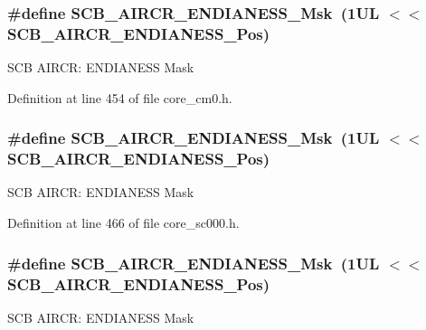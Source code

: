 \subsubsection[{\texorpdfstring{S\+C\+B\+\_\+\+A\+I\+R\+C\+R\+\_\+\+E\+N\+D\+I\+A\+N\+E\+S\+S\+\_\+\+Msk}{SCB_AIRCR_ENDIANESS_Msk}}]{\setlength{\rightskip}{0pt plus 5cm}\#define S\+C\+B\+\_\+\+A\+I\+R\+C\+R\+\_\+\+E\+N\+D\+I\+A\+N\+E\+S\+S\+\_\+\+Msk~(1\+U\+L $<$$<$ S\+C\+B\+\_\+\+A\+I\+R\+C\+R\+\_\+\+E\+N\+D\+I\+A\+N\+E\+S\+S\+\_\+\+Pos)}\hypertarget{group___c_m_s_i_s___s_c_b_ga2f571f93d3d4a6eac9a3040756d3d951}{}\label{group___c_m_s_i_s___s_c_b_ga2f571f93d3d4a6eac9a3040756d3d951}
S\+CB A\+I\+R\+CR\+: E\+N\+D\+I\+A\+N\+E\+SS Mask 

Definition at line 454 of file core\+\_\+cm0.\+h.

\subsubsection[{\texorpdfstring{S\+C\+B\+\_\+\+A\+I\+R\+C\+R\+\_\+\+E\+N\+D\+I\+A\+N\+E\+S\+S\+\_\+\+Msk}{SCB_AIRCR_ENDIANESS_Msk}}]{\setlength{\rightskip}{0pt plus 5cm}\#define S\+C\+B\+\_\+\+A\+I\+R\+C\+R\+\_\+\+E\+N\+D\+I\+A\+N\+E\+S\+S\+\_\+\+Msk~(1\+U\+L $<$$<$ S\+C\+B\+\_\+\+A\+I\+R\+C\+R\+\_\+\+E\+N\+D\+I\+A\+N\+E\+S\+S\+\_\+\+Pos)}\hypertarget{group___c_m_s_i_s___s_c_b_ga2f571f93d3d4a6eac9a3040756d3d951}{}\label{group___c_m_s_i_s___s_c_b_ga2f571f93d3d4a6eac9a3040756d3d951}
S\+CB A\+I\+R\+CR\+: E\+N\+D\+I\+A\+N\+E\+SS Mask 

Definition at line 466 of file core\+\_\+sc000.\+h.

\subsubsection[{\texorpdfstring{S\+C\+B\+\_\+\+A\+I\+R\+C\+R\+\_\+\+E\+N\+D\+I\+A\+N\+E\+S\+S\+\_\+\+Msk}{SCB_AIRCR_ENDIANESS_Msk}}]{\setlength{\rightskip}{0pt plus 5cm}\#define S\+C\+B\+\_\+\+A\+I\+R\+C\+R\+\_\+\+E\+N\+D\+I\+A\+N\+E\+S\+S\+\_\+\+Msk~(1\+U\+L $<$$<$ S\+C\+B\+\_\+\+A\+I\+R\+C\+R\+\_\+\+E\+N\+D\+I\+A\+N\+E\+S\+S\+\_\+\+Pos)}\hypertarget{group___c_m_s_i_s___s_c_b_ga2f571f93d3d4a6eac9a3040756d3d951}{}\label{group___c_m_s_i_s___s_c_b_ga2f571f93d3d4a6eac9a3040756d3d951}
S\+CB A\+I\+R\+CR\+: E\+N\+D\+I\+A\+N\+E\+SS Mask 

